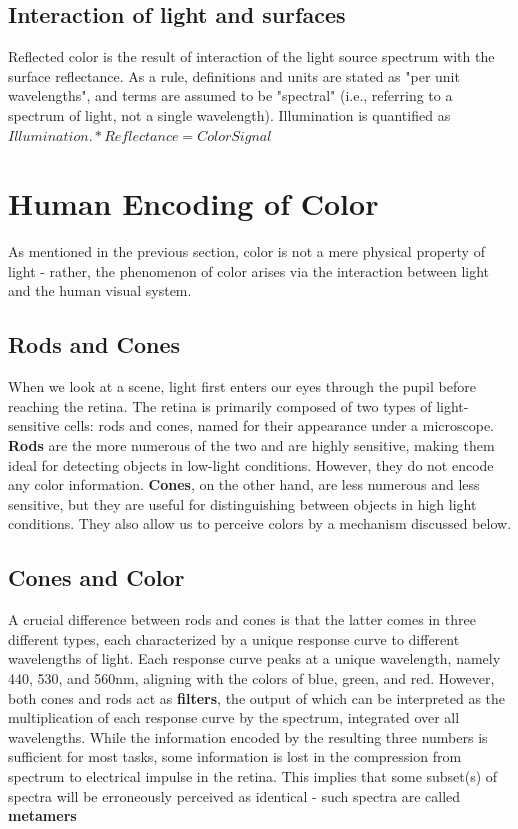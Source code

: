 \documentclass{article}
\begin{document}
\subsection{Interaction of light and surfaces}
Reflected color is the result of interaction of the light source spectrum with the surface reflectance.  As a rule, definitions and units are stated as "per unit wavelengths", and terms are assumed to be "spectral" (i.e., referring to a spectrum of light, not a single wavelength).  Illumination is quantified as $Illumination .* Reflectance = Color Signal$ ~\cite{wandell1995foundations}

\section{Human Encoding of Color}
As mentioned in the previous section, color is not a mere physical property of light - rather, the phenomenon of color arises via the interaction between light and the human visual system.
\subsection{Rods and Cones}
When we look at a scene, light first enters our eyes through the pupil before reaching the retina. The retina is primarily composed of two types of light-sensitive cells: rods and cones, named for their appearance under a microscope. \textbf{Rods} are the more numerous of the two and are highly sensitive, making them ideal for detecting objects in low-light conditions. However, they do not encode any color information. \textbf{Cones}, on the other hand, are less numerous and less sensitive, but they are useful for distinguishing between objects in high light conditions. They also allow us to perceive colors by a mechanism discussed below.

\subsection{Cones and Color}
A crucial difference between rods and cones is that the latter comes in three different types, each characterized by a unique response curve to different wavelengths of light. Each response curve peaks at a unique wavelength, namely 440, 530, and 560nm, aligning with the colors of blue, green, and red. However, both cones and rods act as \textbf{filters}, the output of which can be interpreted as the multiplication of each response curve by the spectrum, integrated over all wavelengths. While the information encoded by the resulting three numbers is sufficient for most tasks, some information is lost in the compression from spectrum to electrical impulse in the retina. This implies that some subset(s) of spectra will be erroneously perceived as identical - such spectra are called \textbf{metamers}
\end{document}
